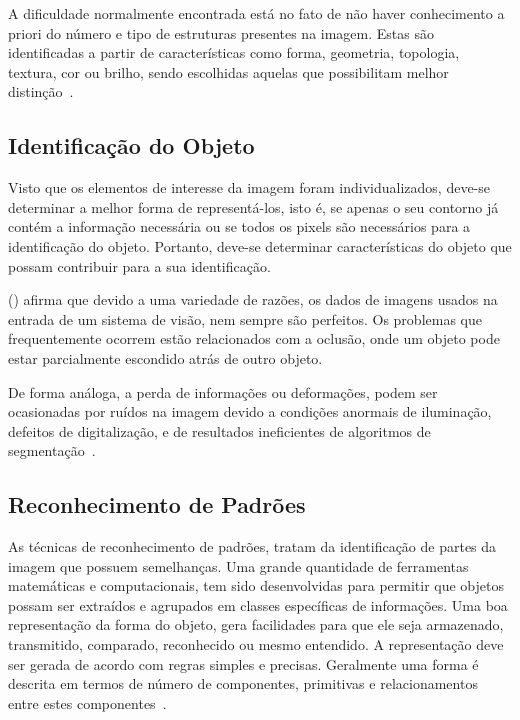 A dificuldade normalmente encontrada está no fato de não haver conhecimento a priori do número e tipo de estruturas presentes na imagem. Estas são identificadas a partir de características como forma, geometria, topologia, textura, cor ou brilho, sendo escolhidas aquelas que possibilitam melhor distinção~\cite{heinen2004navegaccao}.

\subsection{Identificação do Objeto}
\label{subsec:idObjeto}

Visto que os elementos de interesse da imagem foram individualizados, deve-se determinar a melhor forma de representá-los, isto é, se apenas o seu contorno já contém a informação necessária ou se todos os pixels são necessários para a identificação do objeto. Portanto, deve-se determinar características do objeto que possam contribuir para a sua identificação.

\citeauthor{rudek2001visao} (\citeyear{rudek2001visao}) afirma que devido a uma variedade de razões, os dados de imagens usados na entrada de um sistema de visão, nem sempre são perfeitos. Os problemas que frequentemente ocorrem estão relacionados com a oclusão, onde um objeto pode estar parcialmente escondido atrás de outro objeto. 

De forma análoga, a perda de informações ou deformações, podem ser ocasionadas por ruídos na imagem devido a condições anormais de iluminação, defeitos de digitalização, e de resultados ineficientes de algoritmos de segmentação~\cite{beis1999indexing}.

\subsection{Reconhecimento de Padrões}
\label{subsec:recPadroes}

As técnicas de reconhecimento de padrões, tratam da identificação de partes da imagem que possuem semelhanças. Uma grande quantidade de ferramentas matemáticas e computacionais, tem sido desenvolvidas para permitir que objetos possam ser extraídos e agrupados em classes específicas de informações. Uma boa representação da forma do objeto, gera facilidades para que ele seja armazenado, transmitido, comparado, reconhecido ou mesmo entendido. A representação deve ser gerada de acordo com regras simples e precisas. Geralmente uma forma é descrita em termos de número de componentes, primitivas e relacionamentos entre estes componentes~\cite{rudek2001visao}.

